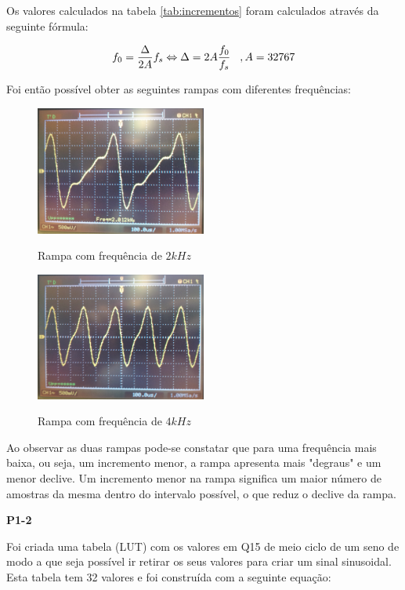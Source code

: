 \documentclass[11pt]{article}
\begin{document}
Os valores calculados na tabela \ref{tab:incrementos} foram calculados através da seguinte fórmula:

\begin{equation}
 f_{0}= \frac{\Delta}{2A}f_{s} \Leftrightarrow \Delta= 2A\frac{f_{0}}{f_{s}} \hspace{3 mm}, A=32767
\end{equation}

Foi então possível obter as seguintes rampas com diferentes frequências:


\begin{figure}[H]
	\centering
	\includegraphics[width=0.5\textwidth]{./P1_2kHz}~\\
	\caption{Rampa com frequência de $ 2 kHz $}
\end{figure}


\begin{figure}[H]
	\centering
	\includegraphics[width=0.5\textwidth]{./P1_4kHz}~\\
	\caption{Rampa com frequência de $ 4 kHz $}
\end{figure}
Ao observar as duas rampas pode-se constatar que para uma frequência mais baixa, ou seja, um incremento menor, a rampa apresenta mais "degraus" e um menor declive. Um incremento menor na rampa significa um maior número de amostras da mesma dentro do intervalo possível, o que reduz o declive da rampa.
\vspace{2 mm}

\textbf{P1-2}
\label{para:P1-2}

Foi criada uma tabela (LUT) com os valores em Q15 de meio ciclo de um seno de modo a que seja possível ir retirar os seus valores para criar um sinal sinusoidal. Esta tabela tem 32 valores e foi construída com a seguinte equação:
\end{document}
